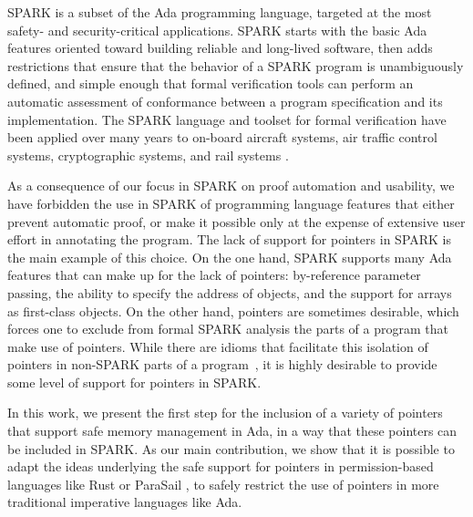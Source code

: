\documentclass{llncs}
\begin{document}
\smallskip
SPARK is a subset of the Ada programming language, targeted at the most safety- and security-critical applications. SPARK starts with the basic Ada features oriented toward building reliable and long-lived software, then adds restrictions that ensure that the behavior of a SPARK program is unambiguously defined, and simple enough that formal verification tools can perform an automatic assessment of conformance between a program specification and its implementation. The SPARK language and toolset for formal verification have been applied over many years to on-board aircraft systems,
air traffic control systems, cryptographic systems, and rail systems \cite{ONeill2012, McCormick2015}.

As a consequence of our focus in SPARK on proof automation and usability, we have forbidden the use in SPARK of programming language features that either prevent automatic proof, or make it possible only at the expense of extensive user effort in annotating the program. The lack of support for pointers in SPARK is the main example of this choice. On the one hand, SPARK supports many Ada features that can make up for the lack of pointers: by-reference parameter passing, the ability to specify the address of objects, and the support for arrays as first-class objects. On the other hand, pointers are sometimes desirable, which forces one to exclude from formal SPARK analysis the parts of a program that make use of pointers. While there are idioms that facilitate this isolation of pointers in non-SPARK parts of a program~\cite{AdaCoreThalesSPARK}, it is highly desirable to provide some level of support for pointers in SPARK.

In this work, we present the first step for the inclusion of a variety of pointers that support safe memory management in Ada, in a way that these pointers can be included in SPARK. As our main contribution, we show that it is possible to adapt the ideas underlying the safe support for pointers in permission-based languages like Rust \cite{Balasubramanian17} or ParaSail , to safely restrict the use of pointers in more traditional imperative languages like Ada. 
\end{document}
